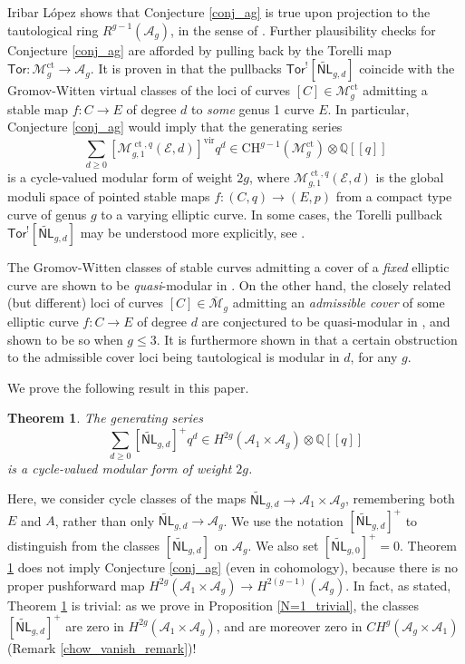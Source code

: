 \documentclass[12pt]{amsart}
\def\cA{\mathcal{A}}
\def\cE{\mathcal{E}}
\def\cM{\mathcal{M}}
\def\bQ{\mathbb{Q}}
\def\barM{\overline{\cM}}
\DeclareMathOperator{\ct}{ct}
\DeclareMathOperator{\vir}{vir}
\newcommand{\CH}{\mathrm{CH}}
\newcommand{\wNL}{{\widetilde{\mathsf{NL}}}}
\newcommand{\Tor}{{\mathsf{Tor}}}
\newtheorem{thm}{Theorem}[section]
\theoremstyle{definition}
\begin{document}
Iribar L\'{o}pez \cite[Corollary 4]{il} shows that Conjecture \ref{conj_ag} is true upon projection to the tautological ring $R^{g-1}(\cA_g)$, in the sense of \cite{cmop}. Further plausibility checks for Conjecture \ref{conj_ag} are afforded by pulling back by the Torelli map $\Tor:\cM_g^{\ct}\to\cA_g$. It is proven in \cite{gl} that the pullbacks $\Tor^{!}[\wNL_{g,d}]$ coincide with the Gromov-Witten virtual classes of the loci of curves $[C]\in \cM_g^{\ct}$ admitting a stable map $f:C\to E$ of degree $d$ to \emph{some} genus 1 curve $E$. In particular, Conjecture \ref{conj_ag} would imply that the generating series
    \begin{equation*}
        \sum_{d\ge 0}[\cM^{\ct,q}_{g,1}(\cE,d)]^{\vir} q^d \in  \CH^{g-1}(\cM_g^{\ct})\otimes \bQ[[q]]
    \end{equation*}
    is a cycle-valued modular form of weight $2g$, where $\cM^{\ct,q}_{g,1}(\cE,d)$ is the global moduli space of pointed stable maps $f:(C,q)\to (E,p)$ from a compact type curve of genus $g$ to a varying elliptic curve. In some cases, the Torelli pullback $\Tor^{!}[\wNL_{g,d}]$ may be understood more explicitly, see \cite{cop}.

The Gromov-Witten classes of stable curves admitting a cover of a \emph{fixed} elliptic curve are shown to be {\it quasi}-modular in \cite{obpix}. On the other hand, the closely related (but different) loci of curves $[C]\in \barM_g$ admitting an \emph{admissible cover} of some elliptic curve $f:C\to E$ of degree $d$ are conjectured to be quasi-modular in \cite{lian_d-ell}, and shown to be so when $g\le 3$. It is furthermore shown in \cite{lian_nontaut} that a certain obstruction to the admissible cover loci being tautological is modular in $d$, for any $g$.

We prove the following result in this paper.

\begin{thm}\label{thm_trivial}
        The generating series
    \begin{equation*}
        \sum_{d\ge 0}[\wNL_{g,d}]^+q^d \in  H^{2g}(\cA_1\times \cA_g)\otimes \bQ[[q]]
    \end{equation*}
    is a cycle-valued modular form of weight $2g$. 
\end{thm}
Here, we consider cycle classes of the maps $\wNL_{g,d}\to \cA_1\times \cA_g$, remembering both $E$ and $A$, rather than only $\wNL_{g,d}\to \cA_g$. We use the notation $[\wNL_{g,d}]^+$ to distinguish from the classes $[\wNL_{g,d}]$ on $\cA_g$. We also set $[\wNL_{g,0}]^+=0$. Theorem \ref{thm_trivial} does not imply Conjecture \ref{conj_ag} (even in cohomology), because there is no proper pushforward map $H^{2g}(\cA_1\times \cA_g)\to H^{2(g-1)}(\cA_g)$. In fact, as stated, Theorem \ref{thm_trivial} is trivial: as we prove in Proposition \ref{N=1_trivial}, the classes $[\wNL_{g,d}]^+$ are zero in $H^{2g}(\cA_1\times \cA_g)$, and are moreover zero in $CH^g(\cA_g\times \cA_1)$ (Remark \ref{chow_vanish_remark})!
\end{document}
